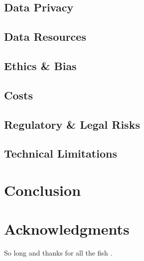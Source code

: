 \documentclass[fleqn,10pt]{SelfArx} %
\begin{document}
\subsection{Data Privacy}
\subsection{Data Resources}
\subsection{Ethics \& Bias}
\subsection{Costs}
\subsection{Regulatory \& Legal Risks}
\subsection{Technical Limitations}

\section{Conclusion}

\lipsum[15-23] %


\section*{Acknowledgments} %


So long and thanks for all the fish \cite{Figueredo:2009dg, Smith:2012qr}.





\end{document}
